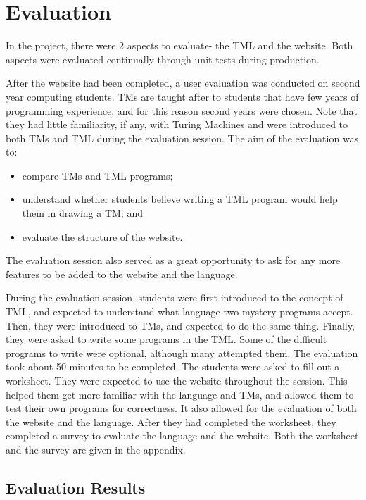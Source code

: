 \chapter{Evaluation} 
In the project, there were 2 aspects to evaluate- the TML and the website. Both aspects were evaluated continually through unit tests during production.

After the website had been completed, a user evaluation was conducted on second year computing students. TMs are taught after to students that have few years of programming experience, and for this reason second years were chosen. Note that they had little familiarity, if any, with Turing Machines and were introduced to both TMs and TML during the evaluation session. The aim of the evaluation was to:
\begin{itemize}
    \item compare TMs and TML programs;
    \item understand whether students believe writing a TML program would help them in drawing a TM; and
    \item evaluate the structure of the website.
\end{itemize}
The evaluation session also served as a great opportunity to ask for any more features to be added to the website and the language.

During the evaluation session, students were first introduced to the concept of TML, and expected to understand what language two mystery programs accept. Then, they were introduced to TMs, and expected to do the same thing. Finally, they were asked to write some programs in the TML. Some of the difficult programs to write were optional, although many attempted them. The evaluation took about 50 minutes to be completed. The students were asked to fill out a worksheet. They were expected to use the website throughout the session. This helped them get more familiar with the language and TMs, and allowed them to test their own programs for correctness. It also allowed for the evaluation of both the website and the language. After they had completed the worksheet, they completed a survey to evaluate the language and the website. Both the worksheet and the survey are given in the appendix.

\section{Evaluation Results}




